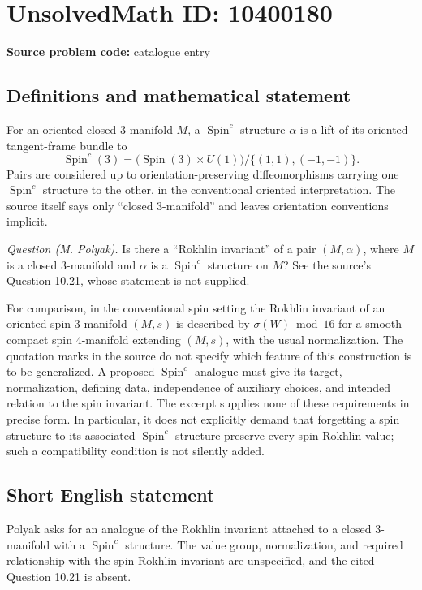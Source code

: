\documentclass[11pt]{article}
\begin{document}
\section*{UnsolvedMath ID: 10400180}
\textbf{Source problem code:} catalogue entry
\subsection{Definitions and mathematical statement}
For an oriented closed \(3\)-manifold \(M\), a \(\operatorname{Spin}^c\) structure \(\alpha\) is a lift of its oriented tangent-frame bundle to
\[
 \operatorname{Spin}^c(3)
 =\bigl(\operatorname{Spin}(3)\times U(1)\bigr)/\{(1,1),(-1,-1)\}.
\]
Pairs are considered up to orientation-preserving diffeomorphisms carrying one \(\operatorname{Spin}^c\) structure to the other, in the conventional oriented interpretation. The source itself says only ``closed \(3\)-manifold'' and leaves orientation conventions implicit.

\emph{Question (M. Polyak).} Is there a ``Rokhlin invariant'' of a pair \((M,\alpha)\), where \(M\) is a closed \(3\)-manifold and \(\alpha\) is a \(\operatorname{Spin}^c\) structure on \(M\)? See the source's Question 10.21, whose statement is not supplied.

For comparison, in the conventional spin setting the Rokhlin invariant of an oriented spin \(3\)-manifold \((M,s)\) is described by \(\sigma(W)\bmod16\) for a smooth compact spin \(4\)-manifold extending \((M,s)\), with the usual normalization. The quotation marks in the source do not specify which feature of this construction is to be generalized. A proposed \(\operatorname{Spin}^c\) analogue must give its target, normalization, defining data, independence of auxiliary choices, and intended relation to the spin invariant. The excerpt supplies none of these requirements in precise form. In particular, it does not explicitly demand that forgetting a spin structure to its associated \(\operatorname{Spin}^c\) structure preserve every spin Rokhlin value; such a compatibility condition is not silently added.
\subsection{Short English statement}
Polyak asks for an analogue of the Rokhlin invariant attached to a closed \(3\)-manifold with a \(\operatorname{Spin}^c\) structure. The value group, normalization, and required relationship with the spin Rokhlin invariant are unspecified, and the cited Question 10.21 is absent.
\end{document}
